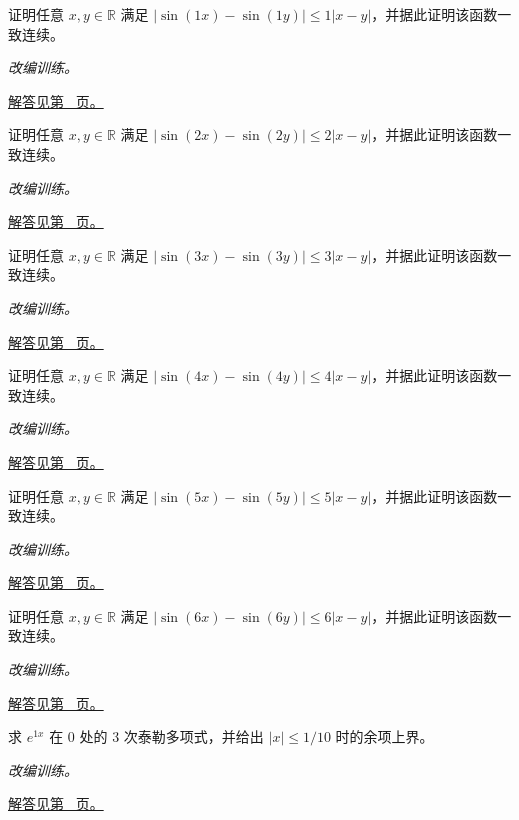 \documentclass[12pt,fontset=fandol]{ctexart}
\begin{document}
\begin{example}[导数界转为函数差的界]\label{ex:c10q8}
证明任意 $x,y\in\mathbb R$ 满足 $|\sin(1x)-\sin(1y)|\le 1|x-y|$，并据此证明该函数一致连续。
\par\textit{改编训练。}\par\hyperref[ans:c10q8]{解答见第~\pageref{ans:c10q8} 页。}
\end{example}
\begin{example}[导数界转为函数差的界]\label{ex:c10q9}
证明任意 $x,y\in\mathbb R$ 满足 $|\sin(2x)-\sin(2y)|\le 2|x-y|$，并据此证明该函数一致连续。
\par\textit{改编训练。}\par\hyperref[ans:c10q9]{解答见第~\pageref{ans:c10q9} 页。}
\end{example}
\begin{example}[导数界转为函数差的界]\label{ex:c10q10}
证明任意 $x,y\in\mathbb R$ 满足 $|\sin(3x)-\sin(3y)|\le 3|x-y|$，并据此证明该函数一致连续。
\par\textit{改编训练。}\par\hyperref[ans:c10q10]{解答见第~\pageref{ans:c10q10} 页。}
\end{example}
\begin{example}[导数界转为函数差的界]\label{ex:c10q11}
证明任意 $x,y\in\mathbb R$ 满足 $|\sin(4x)-\sin(4y)|\le 4|x-y|$，并据此证明该函数一致连续。
\par\textit{改编训练。}\par\hyperref[ans:c10q11]{解答见第~\pageref{ans:c10q11} 页。}
\end{example}
\begin{example}[导数界转为函数差的界]\label{ex:c10q12}
证明任意 $x,y\in\mathbb R$ 满足 $|\sin(5x)-\sin(5y)|\le 5|x-y|$，并据此证明该函数一致连续。
\par\textit{改编训练。}\par\hyperref[ans:c10q12]{解答见第~\pageref{ans:c10q12} 页。}
\end{example}
\begin{example}[导数界转为函数差的界]\label{ex:c10q13}
证明任意 $x,y\in\mathbb R$ 满足 $|\sin(6x)-\sin(6y)|\le 6|x-y|$，并据此证明该函数一致连续。
\par\textit{改编训练。}\par\hyperref[ans:c10q13]{解答见第~\pageref{ans:c10q13} 页。}
\end{example}
\begin{example}[指数函数的泰勒多项式与余项]\label{ex:c10q14}
求 $e^{1x}$ 在 $0$ 处的 $3$ 次泰勒多项式，并给出 $|x|\le1/10$ 时的余项上界。
\par\textit{改编训练。}\par\hyperref[ans:c10q14]{解答见第~\pageref{ans:c10q14} 页。}
\end{example}
\end{document}
